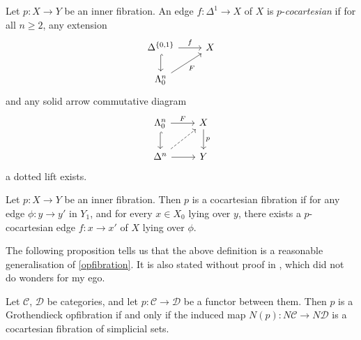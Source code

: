 \documentclass{MetricNotes2023}
\begin{document}
\begin{definition}
Let \(p : X \to Y\) be an inner fibration. An edge \(f : \Delta^1 \to X\) of \(X\) is \(p\)-\textit{cocartesian} if for all \(n \geq 2\), any extension 
\[\begin{tikzcd}
\Delta^{\{0, 1\}} \arrow[r, "f"] \arrow[d, hookrightarrow, swap, ""]  & X \\
\Lambda^n_0 \arrow[ur, swap, "F"]  & 
\end{tikzcd}\]
and any solid arrow commutative diagram
\[\begin{tikzcd}
\Lambda^n_0 \arrow[r, "F"] \arrow[d, hookrightarrow, swap, ""]  & X \arrow[d, "p"]  \\
\Delta^n \arrow[r, swap, ""] \arrow[ur, dashrightarrow, ""]  & Y
\end{tikzcd}\]
a dotted lift exists. 
\end{definition}

\begin{definition}
Let \(p : X \to Y\) be an inner fibration. Then \(p\) is a cocartesian fibration if for any edge \(\phi : y \to y'\) in \(Y_1\), and for every \(x \in X_0\) lying over \(y\), there exists a \(p\)-cocartesian edge \(f : x \to x'\) of \(X\) lying over \(\phi\). 
\end{definition}

The following proposition tells us that the above definition is a reasonable generalisation of \ref{opfibration}. It is also stated without proof in \autocite{lurie2008higher}, which did not do wonders for my ego. 

\begin{proposition}
Let \(\mathcal{C}\), \(\mathcal{D}\) be categories, and let \(p : \mathcal{C} \to \mathcal{D}\) be a functor between them. Then \(p\) is a Grothendieck opfibration if and only if the induced map \(N(p) : N \mathcal{C} \to N\mathcal{D}\) is a cocartesian fibration of simplicial sets.
\end{proposition}
\end{document}

